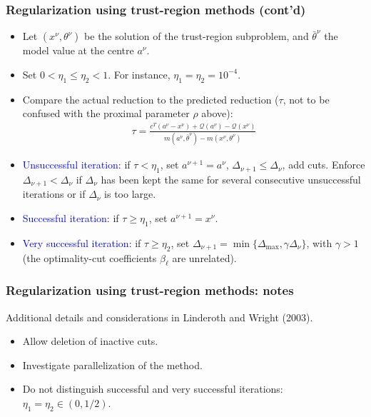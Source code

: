 \documentclass[aspectratio=169]{beamer}
\begin{document}
\begin{frame}
\frametitle{Regularization using trust-region methods (cont'd)}

\begin{itemize}
	\item 
Let $(x^{\nu}, \theta^{\nu})$ be the solution of the trust-region subproblem, and $\bar{\theta}^{\nu}$ the model value at the centre $a^{\nu}$.
\item
Set $0 < \eta_1 \leq \eta_2 < 1$. For instance, $\eta_1 = \eta_2 = 10^{-4}$.
\item
Compare the actual reduction to the predicted reduction ($\tau$, not to be confused with the proximal parameter $\rho$ above):
\begin{align*}
	\tau = \frac{c^T(a^{\nu}-x^{\nu})+\mathcal{Q}(a^{\nu})-\mathcal{Q}(x^{\nu})}{m(a^{\nu},\bar{\theta}^{\nu})-m(x^{\nu},\theta^{\nu})}
\end{align*}
\item
\textcolor{blue}{Unsuccessful iteration}: if $\tau < \eta_1$, set $a^{\nu+1} = a^{\nu}$, $\Delta_{{\nu}+1} \leq \Delta_{\nu}$, add cuts.
Enforce $\Delta_{{\nu}+1} < \Delta_{\nu}$ if $\Delta_{\nu}$ has been kept the same for several consecutive unsuccessful iterations or if $\Delta_{\nu}$ is too large.
\item
\textcolor{blue}{Successful iteration}: if $\tau \geq \eta_1$, set $a^{\nu+1} = x^{\nu}$.
\item
\textcolor{blue}{Very successful iteration}: if $\tau \geq \eta_2$, set $\Delta_{{\nu}+1} = \min \{ \Delta_{\max}, \gamma \Delta_{\nu} \}$, with $\gamma > 1$ (the optimality-cut coefficients $\beta_{\ell}$ are unrelated).
\end{itemize}

\end{frame}

\begin{frame}
\frametitle{Regularization using trust-region methods: notes}

Additional details and considerations in Linderoth and Wright (2003).
\begin{itemize}
\item
Allow deletion of inactive cuts.
\item
Investigate parallelization of the method.
\item
Do not distinguish successful and very successful iterations: $\eta_1 = \eta_2 \in (0, 1/2)$.
\end{itemize}

\end{frame}
\end{document}
